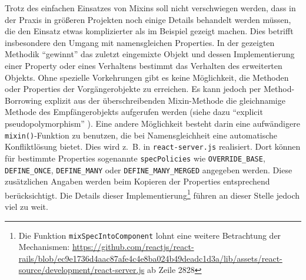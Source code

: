 \skippingparagraph
Trotz des einfachen Einsatzes von Mixins soll nicht verschwiegen werden, dass in der Praxis in größeren Projekten noch einige Details behandelt werden müssen, die den Einsatz etwas komplizierter als im Beispiel gezeigt machen. Dies betrifft insbesondere den Umgang mit namensgleichen Properties. In der gezeigten Methodik "`gewinnt"' das zuletzt eingemixte Objekt und dessen Implementierung einer Property oder eines Verhaltens bestimmt das Verhalten des erweiterten Objekts. Ohne spezielle Vorkehrungen gibt es keine Möglichkeit, die Methoden oder Properties der Vorgängerobjekte zu erreichen. Es kann jedoch per Method-Borrowing explizit aus der überschreibenden Mixin-Methode die gleichnamige Methode des Empfängerobjekts aufgerufen werden (siehe dazu "`explicit pseudopolymorphism"' \citep[p.78]{SimpsonThisobjectprototypes2014}). Eine andere Möglichkeit besteht darin eine aufwändigere \texttt{mixin()}-Funktion zu benutzen, die bei Namensgleichheit eine automatische Konfliktlösung bietet. Dies wird z.~B. in \texttt{react-server.js} realisiert. Dort können für bestimmte Properties sogenannte \texttt{specPolicies} wie \texttt{OVERRIDE\_BASE}, \texttt{DEFINE\_ONCE}, \texttt{DEFINE\_MANY} oder \texttt{DEFINE\_MANY\_MERGED} angegeben werden. Diese zusätzlichen Angaben werden beim Kopieren der Properties entsprechend berücksichtigt. Die Details dieser Implementierung\footnote{
Die Funktion \texttt{mixSpecIntoComponent} lohnt eine weitere Betrachtung der Mechanismen: \url{https://github.com/reactjs/react-rails/blob/ec9e1736d4aac87afe4c4e8ba024b49deadc1d3a/lib/assets/react-source/development/react-server.js} ab Zeile 2828} führen an dieser Stelle jedoch viel zu weit. 


